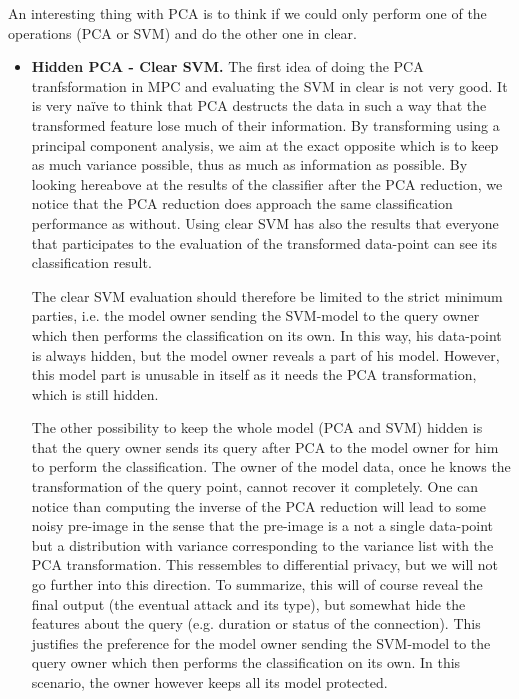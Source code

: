 An interesting thing with PCA is to think if we could only perform one of the operations (PCA or SVM) and do the other one in clear.
\begin{itemize}
    \item \textbf{Hidden PCA - Clear SVM.} The first idea of doing the PCA tranfsformation in MPC and evaluating the SVM in clear is not very good. It is very naïve to think that PCA destructs the data in such a way that the transformed feature lose much of their information. By transforming using a principal component analysis, we aim at the exact opposite which is to keep as much variance possible, thus as much as information as possible. By looking hereabove at the results of the classifier after the PCA reduction, we notice that the PCA reduction does approach the same classification performance as without. Using clear SVM has also the results that everyone that participates to the evaluation of the transformed data-point can see its classification result. 
    
    The clear SVM evaluation should therefore be limited to the strict minimum parties, i.e. the model owner sending the SVM-model to the query owner which then performs the classification on its own. In this way, his data-point is always hidden, but the model owner reveals a part of his model. However, this model part is unusable in itself as it needs the PCA transformation, which is still hidden.

    The other possibility to keep the whole model (PCA and SVM) hidden is that the query owner sends its query after PCA to the model owner for him to perform the classification. The owner of the model data, once he knows the transformation of the query point, cannot recover it completely. One can notice than computing the inverse of the PCA reduction will lead to some noisy pre-image in the sense that the pre-image is a not a single data-point but a distribution with variance corresponding to the variance list with the PCA transformation. This ressembles to differential privacy, but we will not go further into this direction. To summarize, this will of course reveal the final output (the eventual attack and its type), but somewhat hide the features about the query (e.g. duration or status of the connection). This justifies the preference for the model owner sending the SVM-model to the query owner which then performs the classification on its own. In this scenario, the owner however keeps all its model protected.
    

\end{itemize}
